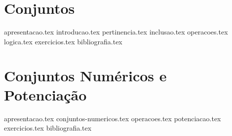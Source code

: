 \documentclass[a4paper,12pt, oneside]{book}
\begin{document}
    \nocite{*}
    \thispagestyle{empty}       %

    \printtitle                 %
        \vfill
    \printauthor                %
    \newpage
    
    \frontmatter %
    \tableofcontents
    \mainmatter %

    \chapter{Conjuntos}
    {apresentacao.tex}
    {introducao.tex}
    {pertinencia.tex}
    {inclusao.tex}
    {operacoes.tex}
    {logica.tex}
    {exercicios.tex}
    {bibliografia.tex} %


    \chapter{Conjuntos Numéricos e Potenciação}
    \label{cap:conjuntos-numericos}    
    {apresentacao.tex}
    {conjuntos-numericos.tex}
    {operacoes.tex}
    {potenciacao.tex}
    {exercicios.tex}
    {bibliografia.tex} %
\end{document}

